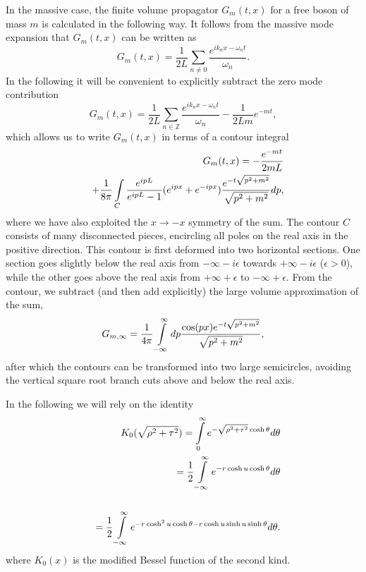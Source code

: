 \documentclass[twocolumn,secnumarabic,amssymb, nobibnotes, aps, prd]{revtex4-2}
\newcommand{\be}{\begin{equation}}
\newcommand{\ee}{\end{equation}}
\newcommand{\bea}{\begin{eqnarray}}
\newcommand{\eea}{\end{eqnarray}}
\begin{document}
In the massive case, the finite volume propagator $G_m(t,x)$ for a free boson of mass $m$ is calculated
in the following way. It follows from the massive mode expansion that $G_m(t,x)$ can be written as
\be
G_m(t,x)= \frac{1}{2L}\sum_{n\neq 0} \frac{e^{i k_n x- \omega_n t}}{\omega_n} .\label{massivePropMode}
\ee
In the following it will be convenient to explicitly subtract the zero mode contribution
\be
G_m(t,x)=\frac{1}{2L}\sum_{n\in\mathbb{Z}} \frac{e^{i k_n x- \omega_n t}}{\omega_n}-\frac{1}{2Lm}e^{-mt},
\ee
which allows us to write $G_m(t,x)$ in terms of a contour integral
\bea
&&G_m(t,x)=-\frac{e^{-mt}}{2mL}\nonumber\\
&&+\frac{1}{8\pi}\intop_C \frac{e^{ipL}}{e^{ipL}-1}(e^{ipx}+e^{-ipx})\frac{e^{-t\sqrt{p^2+m^2}}}{\sqrt{p^2+m^2}}dp,
\eea
where we have also exploited the $x\rightarrow -x$ symmetry of the sum. The contour $C$ consists
of many disconnected pieces, encircling all poles on the real axis in the positive direction.
This contour is first deformed into two horizontal sections. One section goes slightly
below the real axis from $-\infty-i\epsilon$ towards $+\infty-i\epsilon$ ($\epsilon>0$),
while the other goes above the real axis from $+\infty+\epsilon$ to $-\infty+\epsilon$.
From the contour, we subtract (and then add explicitly) the large volume approximation of the sum,
\be
G_{m,\infty}=\frac{1}{4\pi}\intop_{-\infty}^{\infty}dp\frac{\cos(px)e^{-t\sqrt{p^2+m^2}}}{\sqrt{p^2+m^2}},
\ee
after which the contours can be transformed into two large semicircles, avoiding
the vertical square root branch cuts above and below the real axis.

In the following we will rely on the identity
\bea
&&K_0(\sqrt{\rho^2+\tau^2})=\intop_0^\infty e^{-\sqrt{\rho^2+\tau^2}\cosh\theta}d\theta\nonumber\\
&&=\frac{1}{2}\intop_{-\infty}^{\infty}e^{-r\cosh u \cosh\theta}d\theta\cr\cr
&&=\frac{1}{2}\intop_{-\infty}^{\infty}e^{-r\cosh^2 u \cosh\theta-r\cosh u\sinh u\sinh\theta}d\theta \label{mpropint}.
\eea
where $K_0(x)$ is the modified Bessel function of the second kind.
\end{document}
